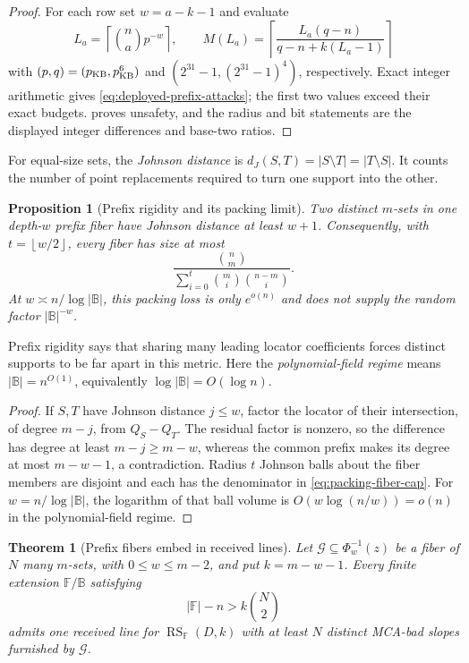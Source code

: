 \documentclass[11pt,a4paper]{amsart}
\numberwithin{equation}{section}
\newtheorem{theorem}{Theorem}[section]
\newtheorem{proposition}[proposition]{Proposition}
\theoremstyle{remark}
\DeclareMathOperator{\RS}{RS}
\newcommand{\F}{\mathbb F}
\newcommand{\B}{\mathbb B}
\newcommand{\abs}[1]{\lvert #1\rvert}
\newcommand{\floor}[1]{\left\lfloor #1\right\rfloor}
\newcommand{\ceil}[1]{\left\lceil #1\right\rceil}
\begin{document}
\begin{proof}
For each row set \(w=a-k-1\) and evaluate
\[
 L_a=\ceil{\binom na p^{-w}},\qquad
 M(L_a)=\ceil{\frac{L_a(q-n)}{q-n+k(L_a-1)}}
\]
with \((p,q)=(p_{\rm KB},p_{\rm KB}^6)\) and
\((2^{31}-1,(2^{31}-1)^4)\), respectively.  Exact integer arithmetic
gives \eqref{eq:deployed-prefix-attacks}; the first two values exceed
their exact budgets.   proves unsafety,
and the radius and bit statements are the displayed integer differences
and base-two ratios.
\end{proof}

For equal-size sets, the \emph{Johnson distance} is
\(d_J(S,T)=\abs{S\setminus T}=\abs{T\setminus S}\).  It counts the
number of point replacements required to turn one support into the other.

\begin{proposition}[Prefix rigidity and its packing limit]
\label{prop:prefix-rigidity-full}
Two distinct \(m\)-sets in one depth-\(w\) prefix fiber have Johnson
distance at least \(w+1\).  Consequently, with
\(t=\floor{w/2}\), every fiber has size at most
\[
 \frac{\binom nm}{\sum_{i=0}^t\binom mi\binom{n-m}{i}}.
 \tag{4.4}\label{eq:packing-fiber-cap}
\]
At \(w\asymp n/\log\abs\B\), this packing loss is only
\(e^{o(n)}\) and does not supply the random factor \(\abs\B^{-w}\).
\end{proposition}

Prefix rigidity says that sharing many leading locator coefficients forces
distinct supports to be far apart in this metric.  Here the
\emph{polynomial-field regime} means \(\abs\B=n^{O(1)}\), equivalently
\(\log\abs\B=O(\log n)\).

\begin{proof}
If \(S,T\) have Johnson distance \(j\le w\), factor the locator of their
intersection, of degree \(m-j\), from \(Q_S-Q_T\).  The residual factor is
nonzero, so the difference has degree at least \(m-j\ge m-w\), whereas the
common prefix makes its degree at most \(m-w-1\), a contradiction.  Radius
\(t\) Johnson balls about the fiber members are disjoint and each has the
denominator in \eqref{eq:packing-fiber-cap}.  For
\(w=n/\log\abs\B\), the logarithm of that ball volume is
\(O(w\log(n/w))=o(n)\) in the polynomial-field regime.
\end{proof}

\begin{theorem}[Prefix fibers embed in received lines]
\label{thm:prefix-to-line-hardness}
Let \(\mathcal G\subseteq\Phi_w^{-1}(z)\) be a fiber of \(N\) many
\(m\)-sets, with \(0\le w\le m-2\), and put \(k=m-w-1\).  Every finite
extension \(\F/\B\) satisfying
\[
        \abs\F-n>k\binom N2
        \tag{4.5}\label{eq:extension-separation}
\]
admits one received line for \(\RS_\F(D,k)\) with at least \(N\) distinct
MCA-bad slopes furnished by \(\mathcal G\).
\end{theorem}
\end{document}
